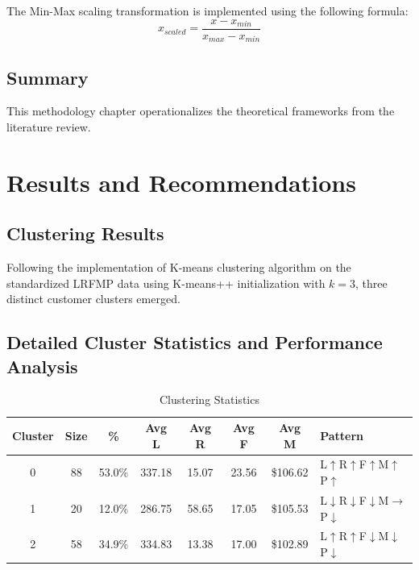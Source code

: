 \documentclass[12pt, a4paper, oneside]{report}
\begin{document}
The Min-Max scaling transformation is implemented using the following formula:
\begin{equation}
    x_{scaled} = \frac{x - x_{min}}{x_{max} - x_{min}}
    \label{eq:minmax}
\end{equation}


\section{Summary}

This methodology chapter operationalizes the theoretical frameworks from the literature review.


\chapter{Results and Recommendations}

\section{Clustering Results}

Following the implementation of K-means clustering algorithm on the standardized LRFMP data using K-means++ initialization with $k=3$, three distinct customer clusters emerged.

\section{Detailed Cluster Statistics and Performance Analysis}

\begin{table}[H]
    \centering
    \caption{Clustering Statistics}
    \label{tab:clustering_stats}
    \begin{tabular}{cccccccl}
        \toprule
        \textbf{Cluster} & \textbf{Size} & \textbf{\%} & \textbf{Avg L} & \textbf{Avg R} & \textbf{Avg F} & \textbf{Avg M} & \textbf{Pattern} \\
        \midrule
        0 & 88  & 53.0\% & 337.18 & 15.07 & 23.56 & \$106.62 & L$\uparrow$R$\uparrow$F$\uparrow$M$\uparrow$P$\uparrow$ \\
        1 & 20  & 12.0\% & 286.75 & 58.65 & 17.05 & \$105.53 & L$\downarrow$R$\downarrow$F$\downarrow$M$\to$P$\downarrow$ \\
        2 & 58  & 34.9\% & 334.83 & 13.38 & 17.00 & \$102.89 & L$\uparrow$R$\uparrow$F$\downarrow$M$\downarrow$P$\downarrow$ \\
        \bottomrule
    \end{tabular}
\end{table}
\end{document}

